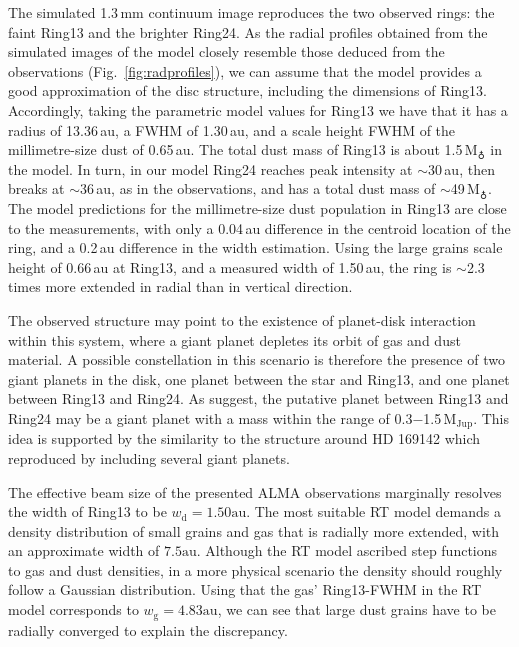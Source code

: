 \documentclass[letters,usenatbib,times]{mnras}
\begin{document}
The simulated 1.3\,mm continuum image reproduces the two observed rings: the faint Ring13 and the brighter Ring24. As the radial profiles obtained from the simulated images of the model closely resemble those deduced from the observations (Fig.~\ref{fig:radprofiles}), we can assume that the model provides a good approximation of the disc structure, including the dimensions of Ring13. Accordingly, taking the parametric model values for Ring13 we have that it has a radius of 13.36\,au, a FWHM of 1.30\,au, and a scale height FWHM of the millimetre-size dust of 0.65\,au. The total dust mass of Ring13 is about 1.5\,M$_{\earth}$ in the model. In turn, in our model Ring24 reaches peak intensity at $\sim$30\,au, then breaks at $\sim$36\,au, as in the observations, and has a total dust mass of $\sim$49\,M$_{\earth}$. The model predictions for the millimetre-size dust population in Ring13 are close to the measurements, with only a 0.04\,au difference in the centroid location of the ring, and a 0.2\,au difference in the width estimation.
Using the large grains scale height of 0.66\,au at Ring13, and a measured width of 1.50\,au, the ring is $\sim$2.3 times more extended in radial than in vertical direction.

The observed structure may point to the existence of planet-disk interaction within this system, where a giant planet depletes its orbit of gas and dust material. A possible constellation in this scenario is therefore the presence of two giant planets in the disk, one planet between the star and Ring13, and one planet between Ring13 and Ring24. As \citet{Ru_z_Rodr_guez_2019} suggest, the putative planet between Ring13 and Ring24 may be a giant planet with a mass within the range of 0.3$-$1.5\,$\mathrm{M}_{\mathrm{Jup}}$. This idea is supported by the similarity to the structure around HD 169142 which \citet{bertrang_avenhaus_2018} reproduced by including several giant planets. %

The effective beam size of the presented ALMA observations marginally resolves the width of Ring13 to be $w_\mathrm{d} = 1.50\mathrm{au}$. The most suitable RT model demands a density distribution of small grains and gas that is radially more extended, with an approximate width of $7.5\mathrm{au}$. Although the RT model ascribed step functions to gas and dust densities, in a more physical scenario the density should roughly follow a Gaussian distribution. Using that the gas' Ring13-FWHM in the RT model corresponds to $w_\mathrm{g} = 4.83\mathrm{au}$, we can see that large dust grains have to be radially converged to explain the discrepancy.
\end{document}
